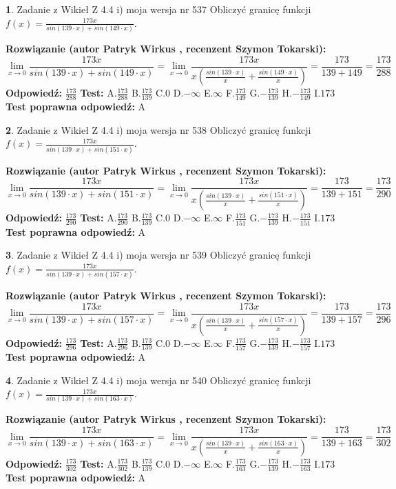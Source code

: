 \documentclass[12pt, a4paper]{article}
\theoremstyle{definition} %
\newtheorem{zad}{}
\newcommand{\zadStart}[1]{\begin{zad}#1\newline}
\newcommand{\zadStop}{\end{zad}}
\newcommand{\rozwStart}[2]{\noindent \textbf{Rozwiązanie (autor #1 , recenzent #2): }\newline}
\newcommand{\rozwStop}{\newline}
\newcommand{\odpStart}{\noindent \textbf{Odpowiedź:}\newline}
\newcommand{\odpStop}{\newline}
\newcommand{\testStart}{\noindent \textbf{Test:}\newline}
\newcommand{\testStop}{\newline}
\newcommand{\kluczStart}{\noindent \textbf{Test poprawna odpowiedź:}\newline}
\newcommand{\kluczStop}{\newline}
\begin{document}
\zadStart{Zadanie z Wikieł Z 4.4 i) moja wersja nr 537}
Obliczyć granicę funkcji $f(x)=\frac{173x}{sin(139\cdot x) +sin(149\cdot x)}$.
\zadStop
\rozwStart{Patryk Wirkus}{Szymon Tokarski}
$$\lim\limits_{x\to 0}\frac{173x}{sin(139\cdot x) +sin(149\cdot x)}=\lim\limits_{x\to 0}\frac{173x}{x(\frac{sin(139\cdot x)}{x}+\frac{sin(149\cdot x)}{x})}=\frac{173}{139+149} = \frac{173}{288}$$
\rozwStop
\odpStart
$\frac{173}{288}$
\odpStop
\testStart
A.$\frac{173}{288}$
B.$\frac{173}{139}$
C.$0$
D.$-\infty$
E.$\infty$
F.$\frac{173}{149}$
G.$-\frac{173}{139}$
H.$-\frac{173}{149}$
I.$173$
\testStop
\kluczStart
A
\kluczStop



\zadStart{Zadanie z Wikieł Z 4.4 i) moja wersja nr 538}
Obliczyć granicę funkcji $f(x)=\frac{173x}{sin(139\cdot x) +sin(151\cdot x)}$.
\zadStop
\rozwStart{Patryk Wirkus}{Szymon Tokarski}
$$\lim\limits_{x\to 0}\frac{173x}{sin(139\cdot x) +sin(151\cdot x)}=\lim\limits_{x\to 0}\frac{173x}{x(\frac{sin(139\cdot x)}{x}+\frac{sin(151\cdot x)}{x})}=\frac{173}{139+151} = \frac{173}{290}$$
\rozwStop
\odpStart
$\frac{173}{290}$
\odpStop
\testStart
A.$\frac{173}{290}$
B.$\frac{173}{139}$
C.$0$
D.$-\infty$
E.$\infty$
F.$\frac{173}{151}$
G.$-\frac{173}{139}$
H.$-\frac{173}{151}$
I.$173$
\testStop
\kluczStart
A
\kluczStop



\zadStart{Zadanie z Wikieł Z 4.4 i) moja wersja nr 539}
Obliczyć granicę funkcji $f(x)=\frac{173x}{sin(139\cdot x) +sin(157\cdot x)}$.
\zadStop
\rozwStart{Patryk Wirkus}{Szymon Tokarski}
$$\lim\limits_{x\to 0}\frac{173x}{sin(139\cdot x) +sin(157\cdot x)}=\lim\limits_{x\to 0}\frac{173x}{x(\frac{sin(139\cdot x)}{x}+\frac{sin(157\cdot x)}{x})}=\frac{173}{139+157} = \frac{173}{296}$$
\rozwStop
\odpStart
$\frac{173}{296}$
\odpStop
\testStart
A.$\frac{173}{296}$
B.$\frac{173}{139}$
C.$0$
D.$-\infty$
E.$\infty$
F.$\frac{173}{157}$
G.$-\frac{173}{139}$
H.$-\frac{173}{157}$
I.$173$
\testStop
\kluczStart
A
\kluczStop



\zadStart{Zadanie z Wikieł Z 4.4 i) moja wersja nr 540}
Obliczyć granicę funkcji $f(x)=\frac{173x}{sin(139\cdot x) +sin(163\cdot x)}$.
\zadStop
\rozwStart{Patryk Wirkus}{Szymon Tokarski}
$$\lim\limits_{x\to 0}\frac{173x}{sin(139\cdot x) +sin(163\cdot x)}=\lim\limits_{x\to 0}\frac{173x}{x(\frac{sin(139\cdot x)}{x}+\frac{sin(163\cdot x)}{x})}=\frac{173}{139+163} = \frac{173}{302}$$
\rozwStop
\odpStart
$\frac{173}{302}$
\odpStop
\testStart
A.$\frac{173}{302}$
B.$\frac{173}{139}$
C.$0$
D.$-\infty$
E.$\infty$
F.$\frac{173}{163}$
G.$-\frac{173}{139}$
H.$-\frac{173}{163}$
I.$173$
\testStop
\kluczStart
A
\kluczStop
\end{document}
